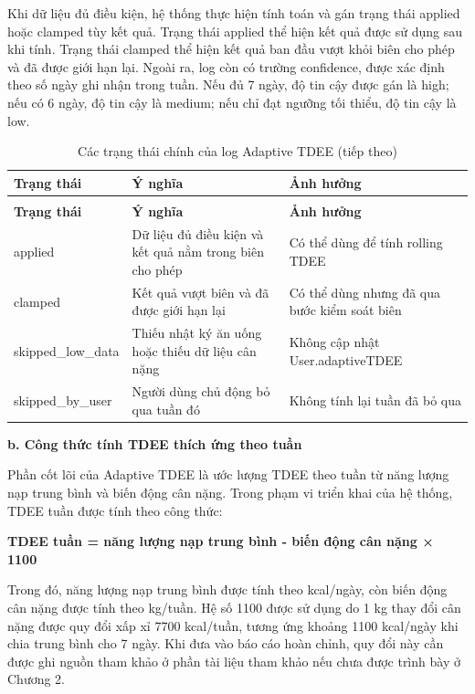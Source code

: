 \documentclass[12pt, a4paper]{report}
\begin{document}
Khi dữ liệu đủ điều kiện, hệ thống thực hiện tính toán và gán trạng thái applied hoặc clamped tùy kết quả. Trạng thái applied thể hiện kết quả được sử dụng sau khi tính. Trạng thái clamped thể hiện kết quả ban đầu vượt khỏi biên cho phép và đã được giới hạn lại. Ngoài ra, log còn có trường confidence, được xác định theo số ngày ghi nhận trong tuần. Nếu đủ 7 ngày, độ tin cậy được gán là high; nếu có 6 ngày, độ tin cậy là medium; nếu chỉ đạt ngưỡng tối thiểu, độ tin cậy là low.

\begin{longtable}{|p{4cm}|p{4cm}|p{7cm}|}
\caption{Các trạng thái chính của log Adaptive TDEE} \\
\hline
\textbf{Trạng thái} & \textbf{Ý nghĩa} & \textbf{Ảnh hưởng} \\
\hline
\endfirsthead
\caption[]{Các trạng thái chính của log Adaptive TDEE (tiếp theo)} \\
\hline
\textbf{Trạng thái} & \textbf{Ý nghĩa} & \textbf{Ảnh hưởng} \\
\hline
\endhead
\hline
\endfoot
\hline
\endlastfoot
applied & Dữ liệu đủ điều kiện và kết quả nằm trong biên cho phép & Có thể dùng để tính rolling TDEE \\
\hline
clamped & Kết quả vượt biên và đã được giới hạn lại & Có thể dùng nhưng đã qua bước kiểm soát biên \\
\hline
skipped\_low\_data & Thiếu nhật ký ăn uống hoặc thiếu dữ liệu cân nặng & Không cập nhật User.adaptiveTDEE \\
\hline
skipped\_by\_user & Người dùng chủ động bỏ qua tuần đó & Không tính lại tuần đã bỏ qua \\
\hline
\hline
\hline
\hline
\hline
\hline
\end{longtable}

\textbf{b. Công thức tính TDEE thích ứng theo tuần}

Phần cốt lõi của Adaptive TDEE là ước lượng TDEE theo tuần từ năng lượng nạp trung bình và biến động cân nặng. Trong phạm vi triển khai của hệ thống, TDEE tuần được tính theo công thức:

\textbf{TDEE tuần = năng lượng nạp trung bình - biến động cân nặng × 1100}

Trong đó, năng lượng nạp trung bình được tính theo kcal/ngày, còn biến động cân nặng được tính theo kg/tuần. Hệ số 1100 được sử dụng do 1 kg thay đổi cân nặng được quy đổi xấp xỉ 7700 kcal/tuần, tương ứng khoảng 1100 kcal/ngày khi chia trung bình cho 7 ngày. Khi đưa vào báo cáo hoàn chỉnh, quy đổi này cần được ghi nguồn tham khảo ở phần tài liệu tham khảo nếu chưa được trình bày ở Chương 2.
\end{document}
